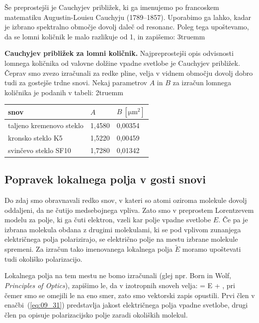 Še preprostejši je Cauchyjev približek, ki ga imenujemo po francoskem matematiku
Augustin-Louisu Cauchyju (1789--1857). Uporabimo ga lahko, kadar je izbrano spektralno
območje dovolj daleč od resonanc. Poleg tega upoštevamo, da se lomni količnik le malo 
razlikuje od 1, in zapišemo:
\vglue3truemm
\begin{example}{\bf Cauchyjev približek za lomni količnik.}
Najpreprostejši opis odvisnosti lomnega količnika od valovne dolžine vpadne svetlobe
je Cauchyjev približek. Čeprav smo zvezo izračunali za redke pline, velja v vidnem
območju dovolj dobro tudi
za gostejše trdne snovi. Nekaj parametrov $A$ in $B$ za izračun lomnega količnika
je podanih v tabeli:
\vglue2truemm
\begin{center}
\begin{tabular}{|l|l|l|}
\hline
snov& $A$ & $B~[\si{\micro\metre}^2]$\\ \hline 
taljeno kremenovo steklo & 1,4580 & 0,00354\\ \hline
kronsko steklo K5 & 1,5220 & 0,00459\\ \hline
svinčevo steklo SF10 & 1,7280 & 0,01342\\ \hline
\end{tabular}
\end{center}
\end{example}

\subsection*{Popravek lokalnega polja v gosti snovi}
Do zdaj smo obravnavali redko snov, v kateri so atomi oziroma molekule
dovolj oddaljeni, da ne čutijo medsebojnega vpliva. 
Zato smo v preprostem Lorentzevem modelu za polje, ki ga čuti elektron, 
vzeli kar polje vpadne svetlobe $E$. Če pa je izbrana molekula obdana
z drugimi molekulami, ki se pod vplivom zunanjega električnega polja 
polarizirajo, se  električno polje na mestu izbrane 
molekule spremeni. Za izračun tako imenovanega lokalnega polja $\tilde{E}$
moramo upoštevati tudi okoliško polarizacijo.

Lokalnega polja na tem mestu ne bomo izračunali (glej npr. Born in Wolf, {\it
Principles of Optics}), zapišimo le, da v izotropnih snoveh velja:
\beq
{} = E + ,
\label{eq:09_31}
\eeq
pri čemer smo se omejili le na eno smer, zato smo vektorski zapis opustili. 
Prvi člen v enačbi~(\ref{eq:09_31}) predstavlja jakost električnega 
polja vpadne svetlobe, drugi člen pa opisuje polarizacijsko 
polje zaradi okoliških molekul. 

